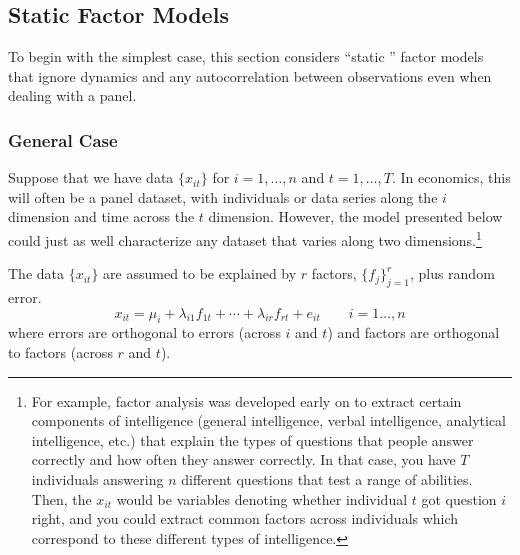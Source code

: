 \documentclass[12pt]{article}
\theoremstyle{plain}
\theoremstyle{definition}
\theoremstyle{remark}
\begin{document}
\clearpage
\subsection{Static Factor Models}

To begin with the simplest case, this section considers ``static ''
factor models that ignore dynamics and any autocorrelation between
observations even when dealing with a panel.

\subsubsection{General Case}

Suppose that we have data $\{x_{it}\}$ for $i=1,\ldots,n$ and
$t=1,\ldots,T$. In economics, this will often be a panel dataset, with
individuals or data series along the $i$ dimension and time across the
$t$ dimension. However, the model presented below could just as well
characterize any dataset that varies along two dimensions.\footnote{For
example, factor analysis was developed early on to extract certain
components of intelligence (general intelligence, verbal intelligence,
analytical intelligence, etc.) that explain the types of questions that
people answer correctly and how often they answer correctly. In that
case, you have $T$ individuals answering $n$ different questions that
test a range of abilities.  Then, the $x_{it}$ would be variables
denoting whether individual $t$ got question $i$ right, and you could
extract common factors across individuals which correspond to these
different types of intelligence.}

The data $\{x_{it}\}$ are assumed to be explained by $r$ factors,
$\{f_j\}_{j=1}^r$, plus random error.
\begin{equation}
  x_{it} = \mu_i + \lambda_{i1} f_{1t} + \cdots + \lambda_{ir} f_{rt} + e_{it}
  \qquad i=1\ldots,n
\end{equation}
where errors are orthogonal to errors (across $i$ and $t$) and factors
are orthogonal to factors (across $r$ and $t$).
\end{document}
